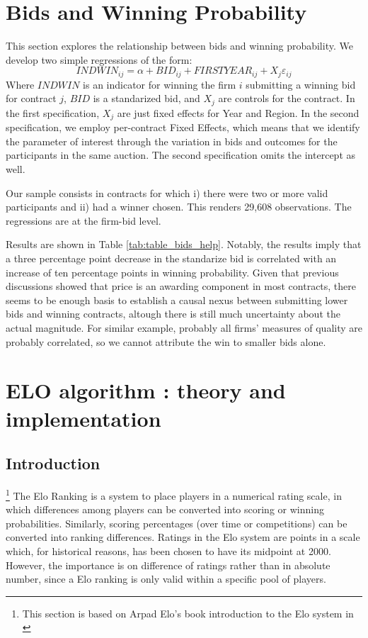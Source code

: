 \clearpage


\section{Bids and Winning Probability}
This section explores the relationship between bids and winning probability. We develop two simple regressions of the form:
\begin{equation}
  \label{eqn:helpbids}
INDWIN_{ij}  = \alpha +BID_{ij}+  FIRSTYEAR_{ij}+X_j\varepsilon_{ij}
\end{equation}
Where $INDWIN$ is an indicator for winning the firm $i$ submitting a winning bid for contract $j$, $BID$ is a standarized bid, and $X_j$ are controls for the contract. In the first specification, $X_j$ are just fixed effects for Year and Region. In the second specification, we employ per-contract Fixed Effects, which means that we identify the parameter of interest through the variation in bids and outcomes for the participants in the same auction. The second specification omits the intercept as well.

Our sample consists in contracts for which i) there were two or more valid participants and ii) had a winner chosen. This renders 29,608 observations. The regressions are at the firm-bid level.

Results are shown in Table \ref{tab:table_bids_help}. Notably, the results imply that a three percentage point decrease in the standarize bid is correlated with an increase of ten percentage points in winning probability. Given that previous discussions showed that price is an awarding component in most contracts, there seems to be enough basis to establish a causal nexus between submitting lower bids and winning contracts, altough there is still much uncertainty about the actual magnitude. For similar  example, probably all firms' measures of quality are probably correlated, so we cannot attribute the win to smaller bids alone.



\clearpage
\section{ELO algorithm : theory and implementation}
\label{section:eloappendix}
\subsection{Introduction}\footnote{This section is based on Arpad Elo's book introduction to the Elo system in \citep{elo1978rating}}
The Elo Ranking is a system to place players in a numerical rating scale, in which differences among players can be converted into scoring or winning probabilities. Similarly, scoring percentages (over time or competitions) can be converted into ranking differences. Ratings in the Elo system are points in a scale which, for historical reasons, has been chosen to have its midpoint at 2000. However, the importance is on difference of ratings rather than in absolute number, since a Elo ranking is only valid within a specific pool of players.

